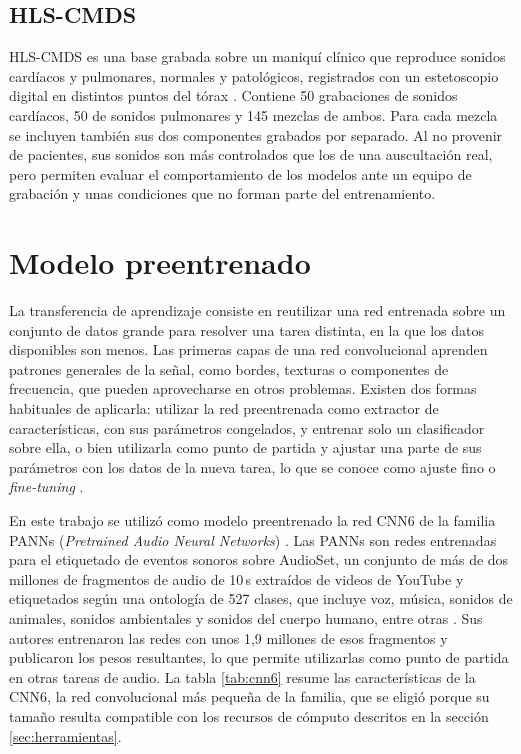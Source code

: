 \subsection{HLS-CMDS}
\label{subsec:hls}

HLS-CMDS es una base grabada sobre un maniquí clínico que reproduce sonidos cardíacos y pulmonares,
normales y patológicos, registrados con un estetoscopio digital en distintos puntos del tórax
\citep{torabi2025hlscmds}. Contiene 50 grabaciones de sonidos cardíacos, 50 de sonidos pulmonares y
145 mezclas de ambos. Para cada mezcla se incluyen también sus dos componentes grabados por
separado. Al no provenir de pacientes, sus sonidos son más controlados que los de una auscultación
real, pero permiten evaluar el comportamiento de los modelos ante un equipo de grabación y unas
condiciones que no forman parte del entrenamiento.


\section{Modelo preentrenado}
\label{sec:preentrenado}

La transferencia de aprendizaje consiste en reutilizar una red entrenada sobre un conjunto de datos
grande para resolver una tarea distinta, en la que los datos disponibles son menos. Las primeras
capas de una red convolucional aprenden patrones generales de la señal, como bordes, texturas o
componentes de frecuencia, que pueden aprovecharse en otros problemas. Existen dos formas habituales
de aplicarla: utilizar la red preentrenada como extractor de características, con sus parámetros
congelados, y entrenar solo un clasificador sobre ella, o bien utilizarla como punto de partida y
ajustar una parte de sus parámetros con los datos de la nueva tarea, lo que se conoce como ajuste
fino o \textit{fine-tuning} \citep{kong2020panns}.

En este trabajo se utilizó como modelo preentrenado la red CNN6 de la familia PANNs
(\textit{Pretrained Audio Neural Networks}) \citep{kong2020panns}. Las PANNs son redes entrenadas
para el etiquetado de eventos sonoros sobre AudioSet, un conjunto de más de dos millones de
fragmentos de audio de 10\,s extraídos de videos de YouTube y etiquetados según una ontología de 527
clases, que incluye voz, música, sonidos de animales, sonidos ambientales y sonidos del cuerpo
humano, entre otras \citep{gemmeke2017audioset}. Sus autores entrenaron las redes con unos 1,9
millones de esos fragmentos y publicaron los pesos resultantes, lo que permite utilizarlas como
punto de partida en otras tareas de audio. La tabla \ref{tab:cnn6} resume las características de la
CNN6, la red convolucional más pequeña de la familia, que se eligió porque su tamaño resulta
compatible con los recursos de cómputo descritos en la sección \ref{sec:herramientas}.

